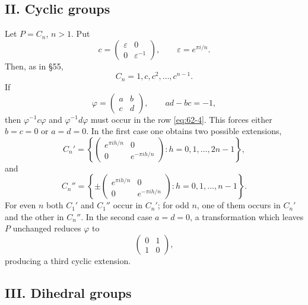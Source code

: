 \documentclass[11pt,a4paper]{book}
\newcommand{\eps}{\varepsilon}
\begin{document}
\subsection*{II. Cyclic groups}

Let \(P=C_n\), \(n>1\).  Put
\begin{equation}\label{eq:62-3}
 c=\begin{pmatrix}\eps&0\\0&\eps^{-1}\end{pmatrix},
 \qquad \eps=e^{\pi i/n}.
\end{equation}
Then, as in \S 55,
\begin{equation}\label{eq:62-4}
 C_n=1,c,c^2,\ldots,c^{n-1}.
\end{equation}
If
\begin{equation}\label{eq:62-5}
 \varphi=\begin{pmatrix}a&b\\c&d\end{pmatrix},
 \qquad ad-bc=-1,
\end{equation}
then \(\varphi^{-1}c\varphi\) and \(\varphi^{-1}d\varphi\) must occur in the row \eqref{eq:62-4}.  This forces either \(b=c=0\) or \(a=d=0\).  In the first case one obtains two possible extensions,
\begin{equation}\label{eq:62-7}
 C_n'=
 \left\{
 \begin{pmatrix}e^{\pi ih/n}&0\\0&e^{-\pi ih/n}\end{pmatrix}:h=0,1,\ldots,2n-1
 \right\},
\end{equation}
and
\begin{equation}\label{eq:62-8}
 C_n''=
 \left\{
 \pm\begin{pmatrix}e^{\pi ih/n}&0\\0&e^{-\pi ih/n}\end{pmatrix}:h=0,1,\ldots,n-1
 \right\}.
\end{equation}
For even \(n\) both \(C_1'\) and \(C_1''\) occur in \(C_n'\); for odd \(n\), one of them occurs in \(C_n'\) and the other in \(C_n''\).  In the second case \(a=d=0\), a transformation which leaves \(P\) unchanged reduces \(\varphi\) to
\[
 \begin{pmatrix}0&1\\1&0\end{pmatrix},
\]
producing a third cyclic extension.

\subsection*{III. Dihedral groups}
\end{document}
